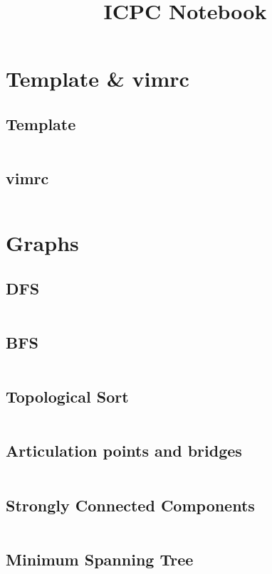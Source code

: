 \documentclass[a4paper, 10pt, twocolumn, landscape]{article}
\title{ICPC Notebook}
\begin{document}
  \pagestyle{fancy}

  \setlength{\columnseprule}{1pt}
  \large

  \maketitle
  \tableofcontents

  \section{Template \& vimrc}
  \subsection{Template}
  \inputminted{cpp}{template.cpp}
  \subsection{vimrc}
  \inputminted{vim}{vimrc}

  \section{Graphs}
  \subsection{DFS}
  \inputminted{cpp}{graphs/dfs.cpp}
  \subsection{BFS}
  \inputminted{cpp}{graphs/bfs.cpp}
  \subsection{Topological Sort}
  \inputminted{cpp}{graphs/kahn.cpp}
  \subsection{Articulation points and bridges}
  \inputminted{cpp}{graphs/articulation.cpp}
  \subsection{Strongly Connected Components}
  \inputminted{cpp}{graphs/kosaraju.cpp}
  \subsection{Minimum Spanning Tree}
  \inputminted{cpp}{graphs/kruskal.cpp}
  \inputminted{cpp}{graphs/prim.cpp}
\end{document}
